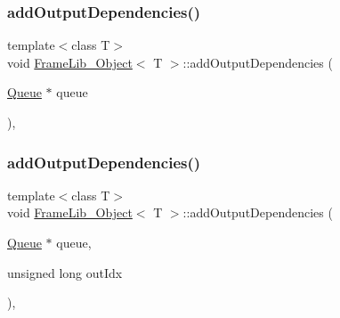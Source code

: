 \subsubsection{\texorpdfstring{add\+Output\+Dependencies()}{addOutputDependencies()}\hspace{0.1cm}{\footnotesize\ttfamily [3/4]}}
{\footnotesize\ttfamily template$<$class T$>$ \\
void \hyperlink{class_frame_lib___object}{Frame\+Lib\+\_\+\+Object}$<$ T $>$\+::add\+Output\+Dependencies (\begin{DoxyParamCaption}\item[{\hyperlink{class_frame_lib___object_a3e6fce9a979bf08406e40e51583cb4ea}{Queue} $\ast$}]{queue }\end{DoxyParamCaption})\hspace{0.3cm}{\ttfamily [inline]}, {\ttfamily [protected]}}

\mbox{\label{class_frame_lib___object_aaf9637ffd5654f73014c2750cfa54bae}} 
\subsubsection{\texorpdfstring{add\+Output\+Dependencies()}{addOutputDependencies()}\hspace{0.1cm}{\footnotesize\ttfamily [4/4]}}
{\footnotesize\ttfamily template$<$class T$>$ \\
void \hyperlink{class_frame_lib___object}{Frame\+Lib\+\_\+\+Object}$<$ T $>$\+::add\+Output\+Dependencies (\begin{DoxyParamCaption}\item[{\hyperlink{class_frame_lib___object_a3e6fce9a979bf08406e40e51583cb4ea}{Queue} $\ast$}]{queue,  }\item[{unsigned long}]{out\+Idx }\end{DoxyParamCaption})\hspace{0.3cm}{\ttfamily [inline]}, {\ttfamily [protected]}}

\mbox{\label{class_frame_lib___object_aa06caf2148631c1a6c3204ac6d8b2bc7}} 
